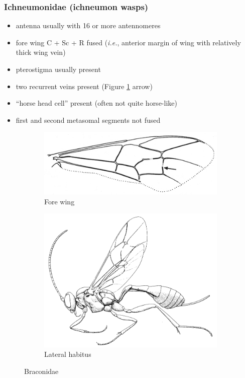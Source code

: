 \documentclass[letterpaper, 11pt]{article}
\begin{document}
\subsubsection{Ichneumonidae (ichneumon wasps)}
\begin{itemize}
\item antenna usually with 16 or more antennomeres
\item fore wing C + Sc + R fused (\textit{i.e.}, anterior margin of wing with relatively thick wing vein)
\item pterostigma usually present
\item two recurrent veins present (Figure \ref{fig:ichneumonid1} arrow)
\item ``horse head cell'' present (often not quite horse-like)
\item first and second metasomal segments not fused 
\end{itemize}

\begin{figure}[ht!]
    \centering
    \begin{subfigure}[ht!]{0.5\textwidth}
        \includegraphics[width=\textwidth]{IchneumonidWing}
        \caption{Fore wing \citep[][pg. 359]{goulet1993hymenoptera}}
        \label{fig:ichneumonid1}
    \end{subfigure}
    \hfill
    \begin{subfigure}[ht!]{0.46\textwidth}
        \includegraphics[width=\textwidth]{IchneumonidHabitus}
        \caption{Lateral habitus \citep[][Fig. 159]{goulet1993hymenoptera}}
        \label{fig:ichneumonid2}
    \end{subfigure}
    \caption{Braconidae}\label{fig:ichneumonids}
\end{figure}
\end{document}
